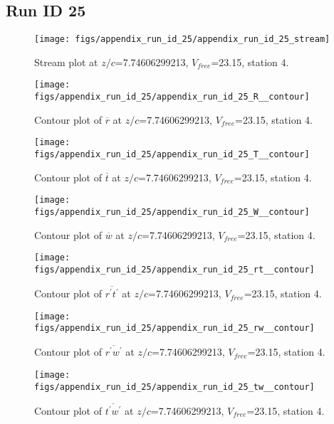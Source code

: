 \subsection{Run ID 25}
\begin{figure}[H]
\centering
\texttt{[image: figs/appendix\_run\_id\_25/appendix\_run\_id\_25\_stream]}
\caption{Stream plot at $z/c$=7.74606299213, $V_{free}$=23.15, station 4.}
\label{fig:appendix_run_id_25_stream}
\end{figure}


\begin{figure}[H]
\centering
\texttt{[image: figs/appendix\_run\_id\_25/appendix\_run\_id\_25\_R\_\_contour]}
\caption{Contour plot of $\overline{r}$ at $z/c$=7.74606299213, $V_{free}$=23.15, station 4.}
\label{fig:appendix_run_id_25_R__contour}
\end{figure}


\begin{figure}[H]
\centering
\texttt{[image: figs/appendix\_run\_id\_25/appendix\_run\_id\_25\_T\_\_contour]}
\caption{Contour plot of $\overline{t}$ at $z/c$=7.74606299213, $V_{free}$=23.15, station 4.}
\label{fig:appendix_run_id_25_T__contour}
\end{figure}


\begin{figure}[H]
\centering
\texttt{[image: figs/appendix\_run\_id\_25/appendix\_run\_id\_25\_W\_\_contour]}
\caption{Contour plot of $\overline{w}$ at $z/c$=7.74606299213, $V_{free}$=23.15, station 4.}
\label{fig:appendix_run_id_25_W__contour}
\end{figure}


\begin{figure}[H]
\centering
\texttt{[image: figs/appendix\_run\_id\_25/appendix\_run\_id\_25\_rt\_\_contour]}
\caption{Contour plot of $\overline{r^\prime t^\prime}$ at $z/c$=7.74606299213, $V_{free}$=23.15, station 4.}
\label{fig:appendix_run_id_25_rt__contour}
\end{figure}


\begin{figure}[H]
\centering
\texttt{[image: figs/appendix\_run\_id\_25/appendix\_run\_id\_25\_rw\_\_contour]}
\caption{Contour plot of $\overline{r^\prime w^\prime}$ at $z/c$=7.74606299213, $V_{free}$=23.15, station 4.}
\label{fig:appendix_run_id_25_rw__contour}
\end{figure}


\begin{figure}[H]
\centering
\texttt{[image: figs/appendix\_run\_id\_25/appendix\_run\_id\_25\_tw\_\_contour]}
\caption{Contour plot of $\overline{t^\prime w^\prime}$ at $z/c$=7.74606299213, $V_{free}$=23.15, station 4.}
\label{fig:appendix_run_id_25_tw__contour}
\end{figure}


